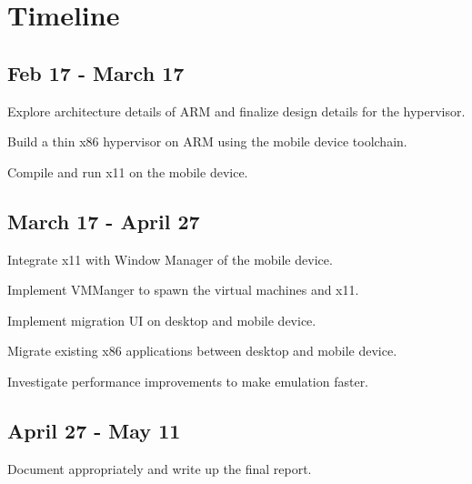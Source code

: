 \section{Timeline}
\subsection{Feb 17 - March 17}
	\begin{itemize*}
	\item Explore architecture details of ARM and finalize design details for the hypervisor.
	\item Build a thin x86 hypervisor on ARM using the mobile device toolchain.
	\item Compile and run x11 on the mobile device.
	\end{itemize*}
\subsection{March 17 - April 27}
	\begin{itemize*}
	\item Integrate x11 with Window Manager of the mobile device.
	\item Implement VMManger to spawn the virtual machines and x11.
        \item Implement migration UI on desktop and mobile device.
        \item Migrate existing x86 applications between desktop and mobile device.
	\item Investigate performance improvements to make emulation faster.
	\end{itemize*}
\subsection{April 27 - May 11}
	\begin{itemize*}
	\item Document appropriately and write up the final report.
	\end{itemize*}

